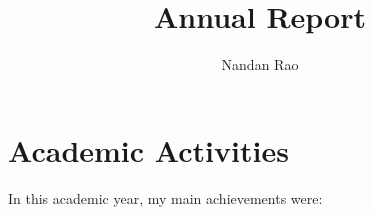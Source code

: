 \message{ !name(report.tex)}\documentclass[a4paper,12pt]{article}
\title{ Annual Report }
\author{Nandan Rao}
\begin{document}
\section { Academic Activities }

In this academic year, my main achievements were: 


\end{document}
